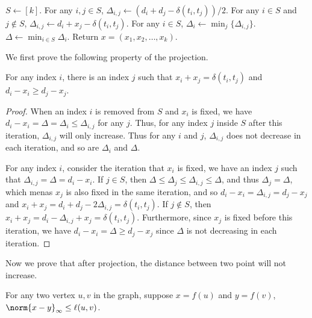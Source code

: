 \begin{algorithm}[H]\label{alg:project}
\caption{Project a point to the metric}
\SetAlgoLined
$S \leftarrow [k]$.\;
{
    For any $i,j \in S$, $\Delta_{i,j} \leftarrow (d_i+d_j-\delta(t_i,t_j))/2$.\;
    For any $i\in S$ and $j \notin S$, $\Delta_{i,j} \leftarrow d_i+x_j-\delta(t_i,t_j)$.\;
    For any $i \in S$, $\Delta_i \leftarrow \min_j\{\Delta_{i,j}\}$.\;
    $\Delta \leftarrow \min_{i\in S} \Delta_i$.\;
}
Return $x=(x_1,x_2,\dots,x_k)$.\;
\end{algorithm}

We first prove the following property of the projection.    

\begin{claim} \label{clm:project}
For any index $i$, there is an index $j$ such that $x_i+x_j = \delta(t_i,t_j)$ and $d_i-x_i \ge d_j-x_j$.
\end{claim}

\begin{proof}
When an index $i$ is removed from $S$ and $x_i$ is fixed, we have $d_i-x_i = \Delta = \Delta_i \le \Delta_{i,j}$ for any $j$. Thus, for any index $j$ inside $S$ after this iteration, $\Delta_{i,j}$ will only increase. Thus for any $i$ and $j$, $\Delta_{i,j}$ does not decrease in each iteration, and so are $\Delta_i$ and $\Delta$.

For any index $i$, consider the iteration that $x_i$ is fixed, we have an index $j$ such that $\Delta_{i,j} = \Delta = d_i-x_i$. If $j \in S$, then $\Delta \le \Delta_j \le \Delta_{i,j} \le \Delta$, and thus $\Delta_j = \Delta$, which menas $x_j$ is also fixed in the same iteration, and so $d_i-x_i = \Delta_{i,j} = d_j-x_j$ and $x_i+x_j = d_i+d_j - 2\Delta_{i,j} = \delta(t_i,t_j)$. If $j \notin S$, then $x_i + x_j = d_i - \Delta_{i,j} + x_j = \delta(t_i,t_j)$. Furthermore, since $x_j$ is fixed before this iteration, we have $d_i-x_i = \Delta \ge d_j-x_j$ since $\Delta$ is not decreasing in each iteration.
\end{proof}

Now we prove that after projection, the distance between two point will not increase.

\begin{lemma} \label{lem:proj_dis}
    For any two vertex $u,v$ in the graph, suppose $x=f(u)$ and $y=f(v)$, $\norm{x-y}_{\infty} \le \ell(u,v)$.
\end{lemma}

